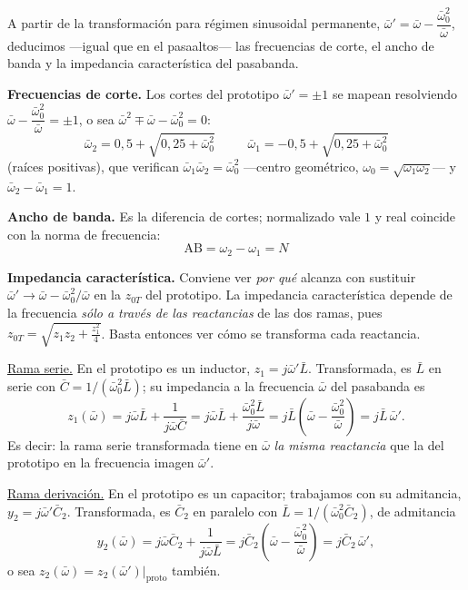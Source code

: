 \documentclass[class=article, crop=false, oneside]{standalone}
\begin{document}
\begin{figure}[H]
    \centering
    
\end{figure}

\noindent A partir de la transformación para régimen sinusoidal permanente,
$\bar\omega' = \bar\omega - \dfrac{\bar\omega_0^2}{\bar\omega}$, deducimos ---igual
que en el pasaaltos--- las frecuencias de corte, el ancho de banda y la impedancia
característica del pasabanda.

\noindent\textbf{Frecuencias de corte.} Los cortes del prototipo $\bar\omega' = \pm1$
se mapean resolviendo $\bar\omega - \dfrac{\bar\omega_0^2}{\bar\omega} = \pm1$, o sea
$\bar\omega^2 \mp \bar\omega - \bar\omega_0^2 = 0$:
\[
    \boxed{\;\bar\omega_2 = 0{,}5 + \sqrt{0{,}25 + \bar\omega_0^2}\;}\qquad
    \boxed{\;\bar\omega_1 = -0{,}5 + \sqrt{0{,}25 + \bar\omega_0^2}\;}
\]
(raíces positivas), que verifican $\bar\omega_1\bar\omega_2 = \bar\omega_0^2$
---centro geométrico, $\omega_0 = \sqrt{\omega_1\omega_2}$--- y $\bar\omega_2-\bar\omega_1 = 1$.

\noindent\textbf{Ancho de banda.} Es la diferencia de cortes; normalizado vale $1$
y real coincide con la norma de frecuencia:
\[
    \boxed{\;\text{AB} = \omega_2-\omega_1 = N\;}
\]

\noindent\textbf{Impedancia característica.} Conviene ver \emph{por qué} alcanza con
sustituir $\bar\omega'\to\bar\omega-\bar\omega_0^2/\bar\omega$ en la $z_{0T}$ del
prototipo. La impedancia característica depende de la frecuencia \emph{sólo a través de
las reactancias} de las dos ramas, pues $z_{0T}=\sqrt{z_1 z_2+\frac{z_1^2}{4}}$. Basta
entonces ver cómo se transforma cada reactancia.

\noindent\underline{Rama serie.} En el prototipo es un inductor, $z_1=j\bar\omega'\bar L$.
Transformada, es $\bar L$ en serie con $\bar C=1/(\bar\omega_0^2\bar L)$; su impedancia a
la frecuencia $\bar\omega$ del pasabanda es
\[
    z_1(\bar\omega) = j\bar\omega\bar L + \frac{1}{j\bar\omega\bar C}
    = j\bar\omega\bar L + \frac{\bar\omega_0^2\bar L}{j\bar\omega}
    = j\bar L\left(\bar\omega-\frac{\bar\omega_0^2}{\bar\omega}\right)
    = j\bar L\,\bar\omega' .
\]
Es decir: la rama serie transformada tiene en $\bar\omega$ \emph{la misma reactancia} que
la del prototipo en la frecuencia imagen $\bar\omega'$.

\noindent\underline{Rama derivación.} En el prototipo es un capacitor; trabajamos con su
admitancia, $y_2=j\bar\omega'\bar C_2$. Transformada, es $\bar C_2$ en paralelo con
$\bar L=1/(\bar\omega_0^2\bar C_2)$, de admitancia
\[
    y_2(\bar\omega) = j\bar\omega\bar C_2 + \frac{1}{j\bar\omega\bar L}
    = j\bar C_2\left(\bar\omega-\frac{\bar\omega_0^2}{\bar\omega}\right)
    = j\bar C_2\,\bar\omega' ,
\]
o sea $z_2(\bar\omega)=z_2(\bar\omega')\big|_{\text{proto}}$ también.
\end{document}
